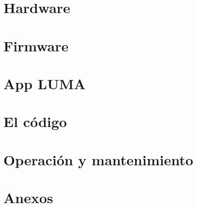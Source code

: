 \documentclass[11pt,a4paper,oneside,openany]{book}
\begin{document}
\frontmatter


\tableofcontents

\mainmatter


\part{Hardware}







\part{Firmware}




\part{App LUMA}




\part{El código}





\part{Operación y mantenimiento}




\appendix
\part*{Anexos}






\end{document}
